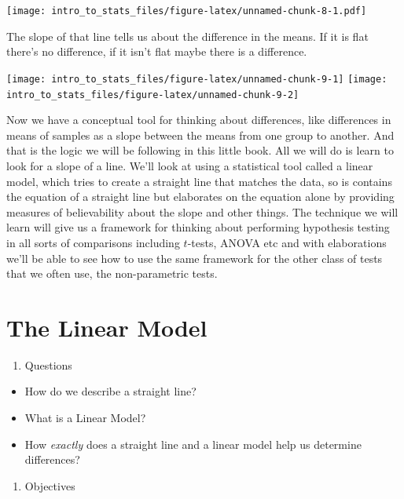 \documentclass[
]{book}
\providecommand{\tightlist}{%
  \setlength{\itemsep}{0pt}\setlength{\parskip}{0pt}}
\begin{document}
\texttt{[image: intro\_to\_stats\_files/figure-latex/unnamed-chunk-8-1.pdf]}

The slope of that line tells us about the difference in the means. If it is flat there's no difference, if it isn't flat maybe there is a difference.

\texttt{[image: intro\_to\_stats\_files/figure-latex/unnamed-chunk-9-1]} \texttt{[image: intro\_to\_stats\_files/figure-latex/unnamed-chunk-9-2]}

Now we have a conceptual tool for thinking about differences, like differences in means of samples as a slope between the means from one group to another. And that is the logic we will be following in this little book. All we will do is learn to look for a slope of a line. We'll look at using a statistical tool called a linear model, which tries to create a straight line that matches the data, so is contains the equation of a straight line but elaborates on the equation alone by providing measures of believability about the slope and other things. The technique we will learn will give us a framework for thinking about performing hypothesis testing in all sorts of comparisons including \(t\)-tests, ANOVA etc and with elaborations we'll be able to see how to use the same framework for the other class of tests that we often use, the non-parametric tests.

\hypertarget{the-linear-model}{%
\chapter{The Linear Model}\label{the-linear-model}}

\begin{enumerate}
\def\labelenumi{\arabic{enumi}.}
\tightlist
\item
  Questions
\end{enumerate}

\begin{itemize}
\tightlist
\item
  How do we describe a straight line?
\item
  What is a Linear Model?
\item
  How \emph{exactly} does a straight line and a linear model help us determine differences?
\end{itemize}

\begin{enumerate}
\def\labelenumi{\arabic{enumi}.}
\setcounter{enumi}{1}
\tightlist
\item
  Objectives
\end{enumerate}
\end{document}
